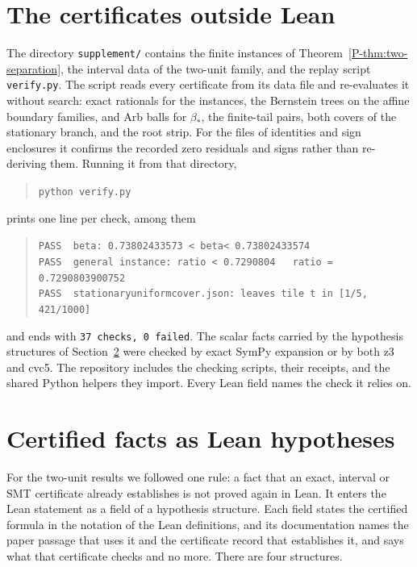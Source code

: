 \documentclass[11pt]{article}
\newcommand{\pref}[1]{\ref*{P-#1}}
\newcommand{\lean}[1]{\begingroup\def\_{\textunderscore\allowbreak}\texttt{\small #1}\endgroup}
\begin{document}
\section{The certificates outside Lean}
\label{s:certificates}

The directory \lean{supplement/} contains the finite instances of
Theorem~\pref{thm:two-separation}, the interval data of the two-unit
family, and the replay script \lean{verify.py}. The script reads every
certificate from its data file and re-evaluates it without search: exact
rationals for the instances, the Bernstein trees on the affine boundary
families, and Arb balls for $\beta_*$, the finite-tail pairs, both covers of
the stationary branch, and the root strip. For the files of identities and
sign enclosures it confirms the recorded zero residuals and signs rather
than re-deriving them. Running it from that directory,

\begin{quote}
\lean{python verify.py}
\end{quote}

prints one line per check, among them

\begin{quote}
\lean{PASS\ \ beta\_*: 0.73802433573 < beta\_* < 0.73802433574}\\
\lean{PASS\ \ general instance: ratio < 0.7290804\ \ \ ratio = 0.7290803900752}\\
\lean{PASS\ \ stationary\_uniform\_cover.json: leaves tile t in [1/5, 421/1000]}
\end{quote}

and ends with \lean{37 checks, 0 failed}. The scalar facts carried by the
hypothesis structures of Section~\ref{s:conditional} were checked by exact
SymPy expansion or by both z3 and cvc5. The repository includes the checking scripts, their receipts, and the
shared Python helpers they import. Every Lean field names the check it
relies on.

\section{Certified facts as Lean hypotheses}
\label{s:conditional}

For the two-unit results we followed one rule: a fact that an exact,
interval or SMT certificate already establishes is not proved again in
Lean. It enters the Lean statement as a field of a hypothesis structure.
Each field states the certified formula in the notation of the Lean
definitions, and its documentation names the paper passage that uses it and
the certificate record that establishes it, and says what that certificate
checks and no more. There are four structures.
\end{document}

